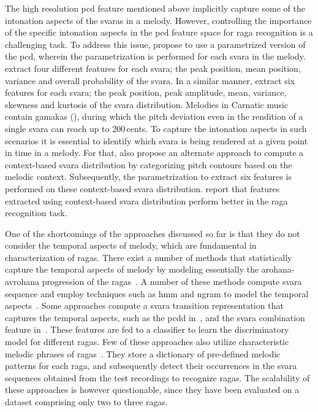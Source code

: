 The high resolution \gls{pcd} feature mentioned above implicitly capture some of the intonation aspects of the \glspl{svara} in a melody. However, controlling the importance of the  specific intonation aspects in the \gls{pcd} feature space for \gls{raga} recognition is a challenging task. To address this issue, \cite{belle2009raga,koduri2014intonation} propose to use a parametrized version of the \gls{pcd}, wherein the parametrization is performed for each \gls{svara} in the melody. \cite{belle2009raga} extract four different features for each \gls{svara}; the peak position, mean position, variance and overall probability of the \gls{svara}.  In a similar manner, \cite{koduri2014intonation} extract six features for each \gls{svara}; the peak position, peak amplitude, mean, variance, skewness and kurtosis of the \gls{svara} distribution. Melodies in Carnatic music contain \glspl{gamaka} (), during which the pitch deviation even in the rendition of a single \gls{svara} can reach up to 200\,cents. To capture the intonation aspects in such scenarios it is essential to identify which \gls{svara} is being rendered at a given point in time in a melody. For that, \cite{koduri2014intonation} also propose an alternate approach to compute a context-based \gls{svara} distribution by categorizing pitch contours based on the melodic context. Subsequently, the parametrization to extract six features is performed on these context-based \gls{svara} distribution. \cite{koduri2014intonation} report that features extracted using context-based \gls{svara} distribution perform better in the \gls{raga} recognition task.

One of the shortcomings of the approaches discussed so far is that they do not consider the temporal aspects of melody, which are fundamental in characterization of \glspl{raga}. There exist  a number of methods that statistically capture the temporal aspects of melody by modeling essentially the \gls{arohana}-\gls{avrohana} progression of the \glspl{raga}~\citep{pandey2003tansen,chordia2007raag,Shetty2009,sridhar2009raga,dighe2013scale,kumar2014identifying}. A number of these methods compute \gls{svara} sequence and employ techniques such as \gls{hmm} and \acrshort{ngram} to model the temporal aspects~\citep{pandey2003tansen,dighe2013scale,kumar2014identifying}. Some approaches compute a \gls{svara} transition representation that captures the temporal aspects, such as the \gls{pcdd} in~\cite{chordia2007raag}, and the \gls{svara} combination feature in~\cite{Shetty2009}. These features are fed to a classifier to learn the discriminatory model for different \glspl{raga}. Few of these approaches also utilize characteristic melodic phrases of \glspl{raga}~\citep{pandey2003tansen,sridhar2009raga}. They store a dictionary of pre-defined melodic patterns for each \gls{raga}, and subsequently detect their occurrences in the \gls{svara} sequences obtained from the test recordings to recognize \glspl{raga}. The scalability of these approaches is however questionable, since they have been evaluated on a dataset comprising only two to three \glspl{raga}. 

